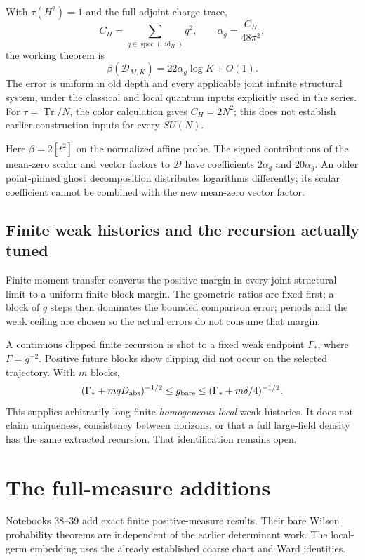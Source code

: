 With \(\tau(H^2)=1\) and the full adjoint charge trace,
\[
 C_H=\sum_{q\in\operatorname{spec}(\operatorname{ad}_H)}q^2,
 \qquad \alpha_g=\frac{C_H}{48\pi^2},
\]
the working theorem is
\[
       \beta(\mathcal D_{M,K})=22\alpha_g\log K+O(1).
\]
The error is uniform in old depth and every applicable
joint infinite structural system, under the classical and
local quantum inputs explicitly used in the series.
For \(\tau=\operatorname{Tr}/N\), the color calculation
gives \(C_H=2N^2\); this does not establish earlier
construction inputs for every \(SU(N)\).

Here \(\beta=2[t^2]\) on the normalized affine probe.
The signed contributions of the mean-zero scalar and vector
factors to \(\mathcal D\) have coefficients
\(2\alpha_g\) and \(20\alpha_g\). An older point-pinned
ghost decomposition distributes logarithms differently;
its scalar coefficient cannot be combined with the new
mean-zero vector factor.

\subsection{Finite weak histories and the recursion actually tuned}

Finite moment transfer converts the positive margin in every
joint structural limit to a uniform finite block margin.
The geometric ratios are fixed first; a block of \(q\)
steps then dominates the bounded comparison error; periods
and the weak ceiling are chosen so the actual errors do
not consume that margin.

A continuous clipped finite recursion is shot to a fixed
weak endpoint \(\Gamma_*\), where \(\Gamma=g^{-2}\).
Positive future blocks show clipping did not occur on
the selected trajectory. With \(m\) blocks,
\[
 (\Gamma_*+mqD_{\rm abs})^{-1/2}
 \le g_{\rm bare}\le
 (\Gamma_*+m\delta/4)^{-1/2}.
\]
This supplies arbitrarily long finite \emph{homogeneous local}
weak histories. It does not claim uniqueness, consistency
between horizons, or that a full large-field density has
the same extracted recursion. That identification remains open.

\section{The full-measure additions}
\label{hdc-fullmeasure}

Notebooks 38--39 add exact finite positive-measure results.
Their bare Wilson probability theorems are independent of
the earlier determinant work. The local-germ embedding uses
the already established coarse chart and Ward identities.

